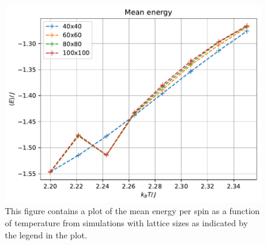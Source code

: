 \documentclass[reprint,english,notitlepage]{revtex4-1}  %
\begin{document}
\begin{figure}[H]
\centering
\includegraphics[width=\columnwidth]{../data/phase-transition-E.pdf}
\caption{This figure contains a plot of the mean energy per spin as a function of temperature from simulations with lattice sizes as indicated by the legend in the plot.} \label{fig:ph-energy}
\end{figure}
\end{document}
